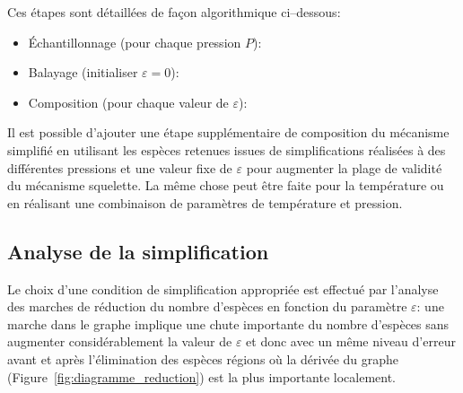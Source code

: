 \noindent Ces étapes sont détaillées de façon algorithmique ci--dessous:
\begin{itemize}
  \item Échantillonnage (pour chaque pression $P$):
  \item Balayage (initialiser $\varepsilon=0$):
  \item Composition (pour chaque valeur de $\varepsilon$):
\end{itemize}

Il est possible d'ajouter une étape supplémentaire de composition du mécanisme simplifié en utilisant les espèces retenues issues de simplifications réalisées à des différentes pressions et une valeur fixe de $\varepsilon$ pour augmenter la plage de validité du mécanisme squelette. La même chose peut être faite pour la température ou en réalisant une combinaison de paramètres de température et pression.

\subsection{Analyse de la simplification}

Le choix d'une condition de simplification appropriée est effectué par l'analyse des \og{}marches\fg{} de réduction du nombre d'espèces en fonction du paramètre $\varepsilon$: une marche dans le graphe implique une chute importante du nombre d'espèces sans augmenter considérablement la valeur de $\varepsilon$ et donc avec un même niveau d'erreur avant et après l'élimination des espèces \textemdash{} régions où la dérivée du graphe (Figure~\ref{fig:diagramme_reduction}) est la plus importante localement.

